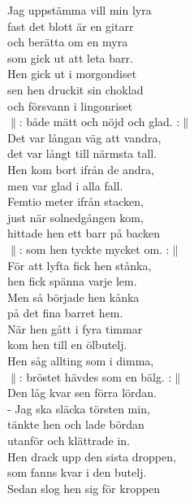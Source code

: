 \documentclass[a6paper, 10pt, twoside]{article}
\begin{document}
\begin{center}
\end{center}
\begin{lyrics}
\small Jag uppstämma vill min lyra\\ 
fast det blott är en gitarr\\ 
och berätta om en myra\\ 
som gick ut att leta barr.\\ 
Hen gick ut i morgondiset\\ 
sen hen druckit sin choklad\\ 
och försvann i lingonriset\\ 
$\|$: både mätt och nöjd och glad. :$\|$
\vspace{5pt}\\ 
Det var långan väg att vandra,\\ 
det var långt till närmsta tall.\\ 
Hen kom bort ifrån de andra,\\ 
men var glad i alla fall.\\ 
Femtio meter ifrån stacken,\\ 
just när solnedgången kom,\\ 
hittade hen ett barr på backen\\ 
$\|$: som hen tyckte mycket om. :$\|$
\vspace{5pt}\\  
För att lyfta fick hen stånka,\\ 
hen fick spänna varje lem.\\
Men så började hen kånka\\ 
på det fina barret hem.\\ 
När hen gått i fyra timmar\\ 
kom hen till en ölbutelj.\\ 
Hen såg allting som i dimma,\\ 
$\|$: bröstet hävdes som en bälg. :$\|$
\vspace{5pt}\\
\newpage
Den låg kvar sen förra lördan.\\ 
- Jag ska släcka törsten min,\\ 
tänkte hen och lade bördan\\ 
utanför och klättrade in.\\ 
Hen drack upp den sista droppen,\\ 
som fanns kvar i den butelj.\\ 
Sedan slog hen sig för kroppen\\

\end{lyrics}
\end{document}
